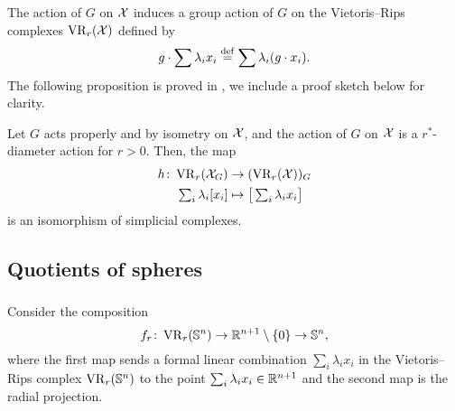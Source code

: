 The action of $G$ on $\mathcal{X}$ induces a group action of $G$ on the Vietoris--Rips complexes $\operatorname{VR}_r(\mathcal{X})$ defined by
\[
g \cdot \sum \lambda_i x_i \stackrel{\mathrm{def}}{=} \sum \lambda_i (g\cdot x_i).
\]
The following proposition is proved in \cite[Proposition 3.5]{adams2022metric}, we include a proof sketch below for clarity.

\medskip\lemma
Let $G$ acts properly and by isometry on $\mathcal{X}$, and the action of $G$ on $\mathcal{X}$ is a $r^*$-diameter action for $r>0$.
Then, the map
\begin{align*}
	h \colon \operatorname{VR}_r(\mathcal{X}_G) &\to (\operatorname{VR}_r(\mathcal{X}))_G \\
	\textstyle\sum_i\lambda_i [x_i] &\mapsto \textstyle \big[\sum_i\lambda_i x_i\big]
\end{align*}
is an isomorphism of simplicial complexes.

%

\subsection{Quotients of spheres}

\subsubsection{}\label{subsub:f}

Consider the composition
\[
f_r \colon \operatorname{VR}_r(\mathbb{S}^n) \to \mathbb{R}^{n+1} \setminus \{0\} \to \mathbb{S}^n,
\]
where the first map sends a formal linear combination $\sum_i\lambda_i x_i$ in the Vietoris--Rips complex $\operatorname{VR}_r(\mathbb{S}^n)$ to the point $\sum_i\lambda_i x_i \in \mathbb{R}^{n+1}$
and the second map is the radial projection.

